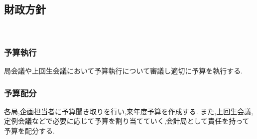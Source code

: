 \subsection*{財政方針}
​
​
\subsubsection*{予算執行}
局会議や上回生会議において予算執行について審議し適切に予算を執行する.
\subsubsection*{予算配分}
各局,企画担当者に予算聞き取りを行い,来年度予算を作成する. 
また,上回生会議,定例会議などで必要に応じて予算を割り当てていく,会計局として責任を持って予算を配分する.
